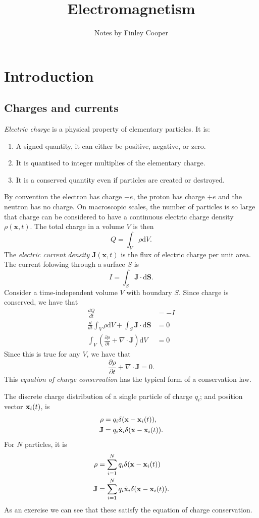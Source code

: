 \documentclass{article}
\title{Electromagnetism}
\author{Notes by Finley Cooper}
\begin{document}
  \maketitle
  \newpage
  \tableofcontents
  \newpage
  \section{Introduction}
  \subsection{Charges and currents}
  \textit{Electric charge} is a physical property of elementary particles. It is:
  \begin{enumerate}
	  \item A signed quantity, it can either be positive, negative, or zero.
	  \item It is quantised to integer multiplies of the elementary charge.
	  \item It is a conserved quantity even if particles are created or destroyed.
  \end{enumerate}
  By convention the electron has charge $ -e $, the proton has charge $ +e $ and the neutron has no charge. On macroscopic scales, the number of particles is so large that charge can be considered to have a continuous electric charge density $ \rho(\mathbf x,t) $. The total charge in a volume $ V $ is then
  \[
    Q=\int_V \rho\mathrm dV.
  \]
  The \textit{electric current density} $ \mathbf J(\mathbf x,t) $ is the flux of electric charge per unit area. The current folowing through a surface $ S $ is
  \[
    I=\int_S\mathbf J\cdot \mathrm d\mathbf S.
  \]
  Consider a time-independent volume $ V $ with boundary $ S $. Since charge is conserved, we have that
\begin{align*}
	\frac{dQ}{dt} &=-I\\
	\frac{d}{dt}\int_V\rho\mathrm dV+\int_S\mathbf J\cdot \mathrm d\mathbf S&=0\\
	\int_V\left(\frac{\partial \rho}{\partial t}+\nabla \cdot \mathbf J\right)\mathrm dV&=0
\end{align*}
Since this is true for any $ V $, we have that
\[
	\frac{\partial \rho}{\partial t}+\nabla\cdot \mathbf J=0.
\]
This \textit{equation of charge conservation} has the typical form of a conservation law.\par
The discrete charge distribution of a single particle of charge $ q_i $; and position vector $ \mathbf{x}_i(t) $, is
\begin{align*}
	\rho&=q_i\delta(\mathbf{x}-\mathbf{x}_i(t)),\\
	\mathbf J &= q_i\dot {\mathbf{x}}_i\delta(\mathbf{x}-\mathbf{x}_i(t)).
\end{align*}
For $ N $ particles, it is 
\begin{align*}
	\rho &= \sum_{i=1}^N q_i\delta(\mathbf{x}-\mathbf{x}_i(t))\\
	\mathbf J &= \sum_{i=1}^N q_i\dot{\mathbf{x}}_i\delta(\mathbf{x}-\mathbf{x}_i(t)).
\end{align*}
As an exercise we can see that these satisfy the equation of charge conservation.
\end{document}
